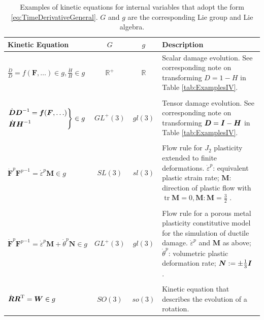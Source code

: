 \documentclass[12pt]{article}
\newcommand{\mbs}[1]{\boldsymbol{#1}}
\newcommand{\mbb}[1]{\mathbb{#1}}
\def\bD{{\mbs{D}}} \def\bE{{\mbs{E}}} \def\bF{{\mbs{F}}}
\def\bM{{\mbs{M}}} \def\bN{{\mbs{N}}} \def\bO{{\mbs{O}}}
\DeclareMathOperator{\tr}{tr}
\begin{document}
\begin{table}[htbp]
  \begin{center}
    \begin{tabular}{ l c c p{60mm} }
      \toprule
      Kinetic Equation
      &
      $G$
      &
      $g$
      &
      Description
      \\
      \hline
      $\displaystyle\frac{\dot{D}}{D} =
      f(\bF,\ldots) \in g,
      \frac{\dot{H}}{H} \in g$
      &
      $\mbb{R}^+$
      &
      $\mbb{R}$
      &
      Scalar damage evolution. See corresponding note on
      transforming $D = 1 - H$ in Table
      \ref{tab:ExamplesIV}.
      \\
      \\
      \multirow{2}{*}{$\left.\begin{aligned}& \dot{\bD}\bD^{-1} =
          \fb(\bF,\ldots) \\
          & \dot{\bH}\bH^{-1}
        \end{aligned}\right\} \in g$}
      &
      $GL^+(3)$
      &
      $gl(3)$
      &
      Tensor damage evolution. See corresponding note on
      transforming $\bD = \bI - \bH$ in Table
      \ref{tab:ExamplesIV}.
      \\
      \\
      $\dot{\bF}^p {\bF^p}^{-1} = \dot{\varepsilon}^p \bM \in g$
      &
      $SL(3)$
      &
      $sl(3)$
      &
      Flow rule for $J_2$ plasticity extended to finite
      deformations. $\dot{\varepsilon}^p$: equivalent plastic strain rate;
      $\bM$: direction of plastic flow with $\tr \bM = 0, \bM:\bM =
      \frac{3}{2}$
      \citep{Ortiz.Stainier:1999}.
      \\
      \\
      $\dot{\bF}^p {\bF^p}^{-1} = \dot{\varepsilon}^p \bM +
      \dot{\theta}^p \bN \in g$
      &
      $GL^+(3)$
      &
      $gl(3)$
      &
      Flow rule for a porous metal plasticity constitutive model for
      the simulation of ductile damage. $\dot{\varepsilon}^p$ and
      $\bM$ as above; $\dot{\theta}^p$: volumetric plastic deformation rate;
      $\bN := \pm \frac{1}{3} \bI$ \citep{Weinberg.etal:2006}.
      \\
      \\
      $\dot{\bR} {\bR}^{\text{T}} = \bW \in g$
      &
      $SO(3)$
      &
      $so(3)$
      &
      Kinetic equation that describes the evolution of a rotation.
      \\
      \bottomrule
    \end{tabular}
    \caption{Examples of kinetic equations for internal variables that
      adopt the form \ref{eq:TimeDerivativeGeneral}. $G$ and $g$ are
      the corresponding Lie group and Lie algebra.}
    \label{tab:ExamplesEvolution}
  \end{center}
\end{table}
\end{document}
